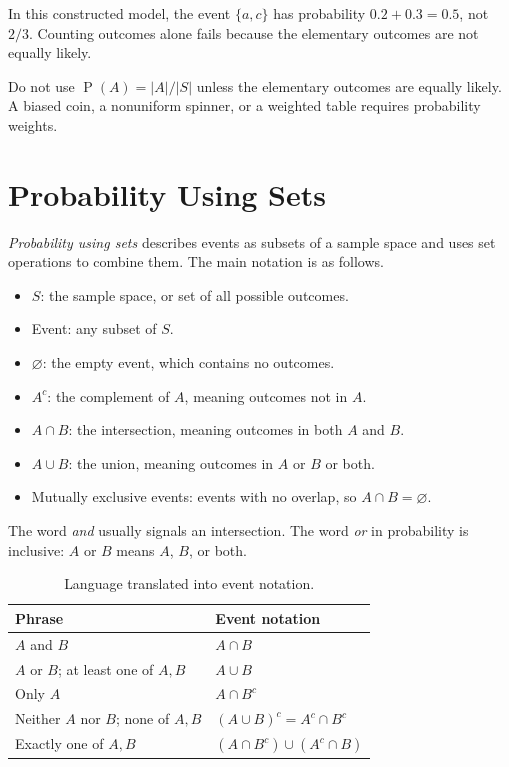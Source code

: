 \documentclass[11pt]{article}
\newcommand{\Pp}{\operatorname{P}}
\begin{document}
In this constructed model, the event $\{a,c\}$ has probability
$0.2+0.3=0.5$, not $2/3$.  Counting outcomes alone fails because the elementary
outcomes are not equally likely.

\begin{keybox}
Do not use $\Pp(A)=|A|/|S|$ unless the elementary outcomes are equally likely.
A biased coin, a nonuniform spinner, or a weighted table requires probability
weights.
\end{keybox}

\section{Probability Using Sets}\label{sec:sets}
\emph{Probability using sets} describes events as subsets of a sample space and
uses set operations to combine them.  The main notation is as follows.
\begin{itemize}
\item $S$: the sample space, or set of all possible outcomes.
\item Event: any subset of $S$.
\item $\varnothing$: the empty event, which contains no outcomes.
\item $A^c$: the complement of $A$, meaning outcomes not in $A$.
\item $A\cap B$: the intersection, meaning outcomes in both $A$ and $B$.
\item $A\cup B$: the union, meaning outcomes in $A$ or $B$ or both.
\item Mutually exclusive events: events with no overlap, so $A\cap B=\varnothing$.
\end{itemize}

The word \emph{and} usually signals an intersection.  The word \emph{or} in
probability is inclusive: $A$ or $B$ means $A$, $B$, or both.

\begin{table}[ht]
\centering
\caption{Language translated into event notation.}\label{tab:set-language}
\begin{tabularx}{\textwidth}{@{}lY@{}}
\toprule
Phrase & Event notation \\
\midrule
$A$ and $B$ & $A\cap B$ \\
$A$ or $B$; at least one of $A,B$ & $A\cup B$ \\
Only $A$ & $A\cap B^c$ \\
Neither $A$ nor $B$; none of $A,B$ & $(A\cup B)^c=A^c\cap B^c$ \\
Exactly one of $A,B$ & $(A\cap B^c)\cup(A^c\cap B)$ \\
\bottomrule
\end{tabularx}
\end{table}
\end{document}
